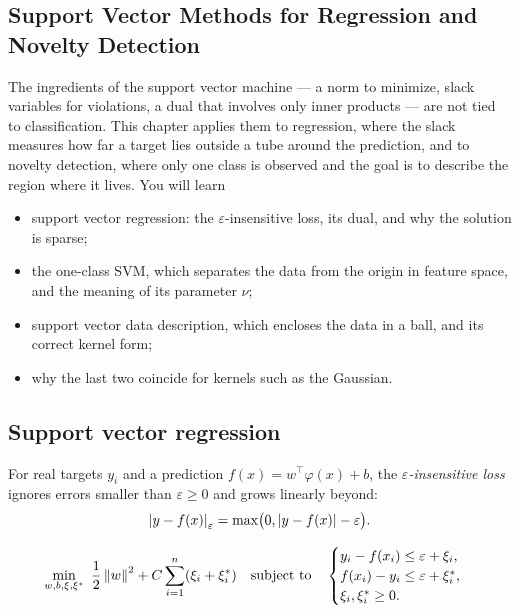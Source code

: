 \begin{notechapter}
\chapter{Support Vector Methods for Regression and Novelty Detection}\label{ch:support-vector-methods}

\begin{chapterintro}
The ingredients of the support vector machine --- a norm to minimize, slack
variables for violations, a dual that involves only inner products --- are not tied
to classification. This chapter applies them to regression, where the slack measures
how far a target lies outside a tube around the prediction, and to novelty detection,
where only one class is observed and the goal is to describe the region where it
lives. You will learn
\begin{itemize}[nosep]
  \item support vector regression: the $\varepsilon$-insensitive loss, its dual, and why the
        solution is sparse;
  \item the one-class SVM, which separates the data from the origin in feature space,
        and the meaning of its parameter $\nu$;
  \item support vector data description, which encloses the data in a ball, and its
        correct kernel form;
  \item why the last two coincide for kernels such as the Gaussian.
\end{itemize}
\end{chapterintro}

\section{Support vector regression}\label{support-vector-methods:sec:svr}

For real targets $y_i$ and a prediction $f(x) = w^\top\varphi(x) + b$, the \emph{$\varepsilon$-insensitive loss}
ignores errors smaller than $\varepsilon\geq0$ and grows linearly beyond:
\[
  \left|y - f(x)\right|_\varepsilon = \max\bigl(0, \left|y - f(x)\right| - \varepsilon\bigr).
\]

\begin{definition}
\[
  \min_{w, b, \xi, \xi^*}\ \frac12\left\|w\right\|^2 + C\sum_{i=1}^n(\xi_i + \xi_i^*)\quad\text{subject to}\quad
  \begin{cases}y_i - f(x_i)\leq\varepsilon + \xi_i,\\ f(x_i) - y_i\leq\varepsilon + \xi_i^*,\\ \xi_i, \xi_i^*\geq0 .\end{cases}
\]
\end{definition}


\end{notechapter}
